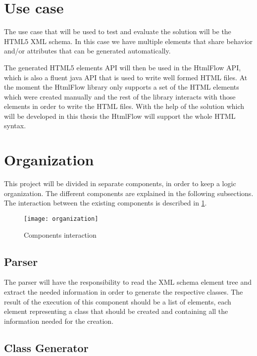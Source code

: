 \section{Use case}

The use case that will be used to test and evaluate the solution will be the HTML5 XML schema. In this case we have multiple elements that share behavior and/or attributes that can be generated automatically.

\noindent
The generated HTML5 elements API will then be used in the HtmlFlow API, which is also a fluent java API that is used to write well formed HTML files. At the moment the HtmlFlow library only supports a set of the HTML elements which were created manually and the rest of the library interacts with those elements in order to write the HTML files. With the help of the solution which will be developed in this thesis the HtmlFlow will support the whole HTML syntax.

\newpage

\section{Organization}

This project will be divided in separate components, in order to keep a logic organization. The different components are explained in the following subsections. The interaction between the existing components is described in \ref{ComponentInteraction}.

\begin{figure}[ht]
	\centering
	\texttt{[image: organization]}
	\caption{Components interaction}
	\label{ComponentInteraction}
\end{figure}

\subsection{Parser}

The parser will have the responsibility to read the XML schema element tree and extract the needed information in order to generate the respective classes. The result of the execution of this component should be a list of elements, each element representing a class that should be created and containing all the information needed for the creation.

\subsection{Class Generator}


